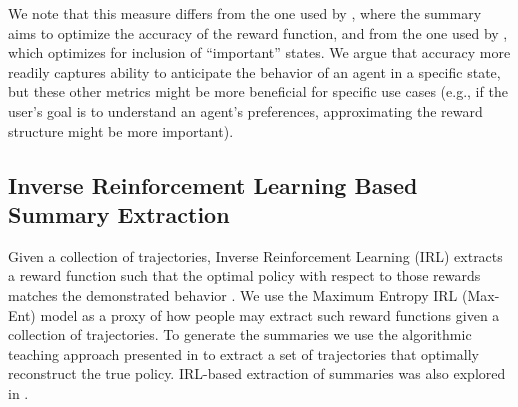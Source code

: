 \documentclass{article}
\begin{document}
We note that this measure differs from the one used by \cite{huang17communicate}, where the summary aims to optimize the accuracy of the reward function, and from the one used by \cite{amir2018highlights}, which optimizes for inclusion of ``important'' states. We argue that accuracy more readily captures ability to anticipate the behavior of an agent in a specific state, but these other metrics might be more beneficial for specific use cases (e.g., if the user's goal is to understand an agent's preferences, approximating the reward structure might be more important).

\subsection{Inverse Reinforcement Learning Based Summary Extraction}
Given a collection of trajectories, Inverse Reinforcement Learning (IRL) extracts a reward function such that the optimal policy with respect to those rewards matches the demonstrated behavior \cite{ng2000algorithms}. We use the Maximum Entropy IRL (Max-Ent) model \cite{ziebart2008maximum} as a proxy of how people may extract such reward functions given a collection of trajectories. To generate the summaries we use the algorithmic teaching approach presented in \cite{brown2018machineteachingirl} to extract a set of trajectories that optimally reconstruct the true policy. IRL-based extraction of summaries was also explored in \cite{huang17communicate}.
 
\end{document}
